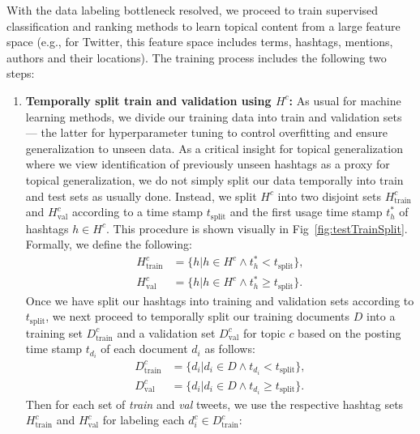 With the data labeling bottleneck resolved, we proceed to train
supervised classification and ranking methods to learn topical content
from a large feature space (e.g., for Twitter, this feature space
includes terms, hashtags, mentions, authors and their locations). The
training process includes the following two steps:
\begin{enumerate}
\item {\bf Temporally split train and validation using $H^c$:}
As usual for machine learning methods, we divide our training data into
train and validation sets --- the latter for hyperparameter tuning to control
overfitting and ensure generalization to unseen data.  
As a critical insight for topical generalization where we view identification
of previously unseen hashtags as a proxy for topical generalization, we do not simply
split our data temporally into train and test sets as usually done.  Instead,
we split $H^c$ into two disjoint sets $H^c_\mathrm{train}$ and $H^c_\mathrm{val}$ 
according to a time stamp $t_\mathrm{split}$ and the first usage time stamp 
$t_h^\mathrm{*}$ of hashtags $h \in H^c$. This procedure is shown visually in Fig~\ref{fig:testTrainSplit}.
 Formally, we define the following:
\begin{align*}
H^c_\mathrm{train} & = \{ h | h \in H^c \land t_{h}^* <    t_\mathrm{split} \} ,  \\
H^c_\mathrm{val}   & = \{ h | h \in H^c \land t_{h}^{*} \geq t_\mathrm{split} \} .
\end{align*}
Once we have split our hashtags into training and validation sets
according to $t_\mathrm{split}$, we next proceed to temporally split
our training documents $D$ into a training set $D^c_\mathrm{train}$ and a validation set
$D^c_\mathrm{val}$ for topic $c$ based on the posting
time stamp $t_{d_i}$ of each document $d_i$ as follows: 
\begin{align*}
D^c_\mathrm{train} & = \{ d_i | d_i \in D \land t_{d_i} <    t_\mathrm{split} \} ,  \\
D^c_\mathrm{val}   & = \{ d_i | d_i \in D \land t_{d_i} \geq t_\mathrm{split} \} .
\end{align*}
Then for each set of \emph{train} and \emph{val} tweets, we use the respective
hashtag sets $H^c_\mathrm{train}$ and $H^c_\mathrm{val}$ for labeling each $d_{i}^{c} \in D^c_\mathrm{train}$:

\end{enumerate}
